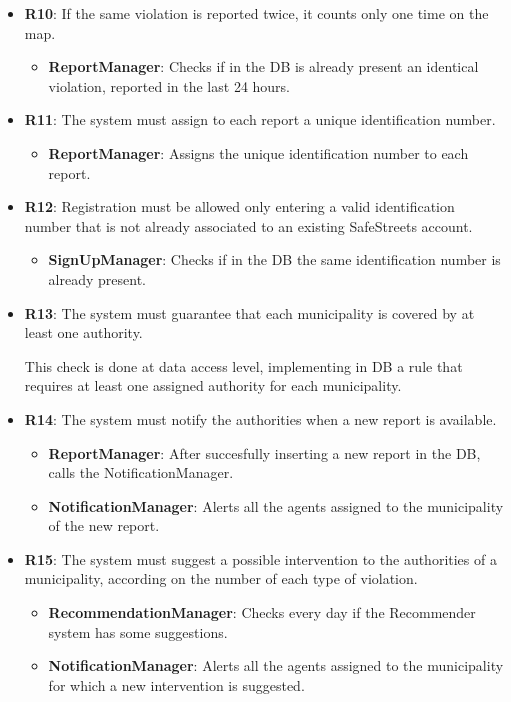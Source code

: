 \documentclass[12pt,a4paper]{report}
\begin{document}
\begin{itemize}
	\item\textbf{R10}: If the same violation is reported twice, it counts only one time on the map.
		\begin{itemize}
		\item\textbf{ReportManager}: Checks if in the DB is already present an identical violation, reported in the last 24 hours.
		\end{itemize}
			
	\item\textbf{R11}: The system must assign to each report a unique identification number.
		\begin{itemize}
		\item\textbf{ReportManager}: Assigns the unique identification number to each report.
		\end{itemize}
			
	\item\textbf{R12}: Registration must be allowed only entering a valid identification number that is not already associated to an existing SafeStreets account.
		\begin{itemize}
		\item\textbf{SignUpManager}: Checks if in the DB the same identification number is already present.
		\end{itemize}
			
	\item\textbf{R13}: The system must guarantee that each municipality is covered by at least one authority.

		This check is done at data access level, implementing in DB a rule that requires at least one assigned authority for each municipality.
			
	\item\textbf{R14}: The system must notify the authorities when a new report is available.
		\begin{itemize}
		\item\textbf{ReportManager}: After succesfully inserting a new report in the DB, calls the NotificationManager.
		\item\textbf{NotificationManager}: Alerts all the agents assigned to the municipality of the new report.
		\end{itemize}
			
	\item\textbf{R15}: The system must suggest a possible intervention to the authorities of a municipality, according on the number of each type of violation.
		\begin{itemize}
		\item\textbf{RecommendationManager}: Checks every day if the Recommender system has some suggestions.		
		\item\textbf{NotificationManager}: Alerts all the agents assigned to the municipality for which a new intervention is suggested.
		\end{itemize}
			

\end{itemize}
\end{document}
